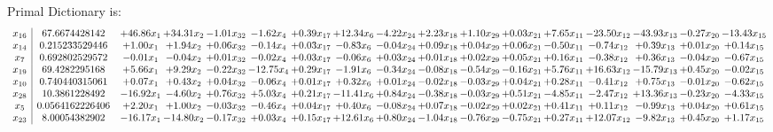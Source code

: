 \documentclass[9pt]{article}
\begin{document}
Primal Dictionary is:
\[\begin{array}{c| c c@{\hskip 2pt} c@{\hskip 2pt} c@{\hskip 2pt} c@{\hskip 2pt} c@{\hskip 2pt} c@{\hskip 2pt} c@{\hskip 2pt} c@{\hskip 2pt} c@{\hskip 2pt} c@{\hskip 2pt} c@{\hskip 2pt} c@{\hskip 2pt} c@{\hskip 2pt} c@{\hskip 2pt} c@{\hskip 2pt} }
 x_{16}   &  67.6674428142 & + 46.86 x_{1} & + 34.31 x_{2} & -1.01 x_{32} & -1.62 x_{4} & +  0.39 x_{17} & + 12.34 x_{6} & -4.22 x_{24} & +  2.23 x_{18} & +  1.10 x_{29} & +  0.03 x_{21} & +  7.65 x_{11} & -23.50 x_{12} & -43.93 x_{13} & -0.27 x_{20} & -13.43 x_{15}\\
 x_{14}   &  0.215233529446 & +  1.00 x_{1} & +  1.94 x_{2} & +  0.06 x_{32} & -0.14 x_{4} & +  0.03 x_{17} & -0.83 x_{6} & -0.04 x_{24} & +  0.09 x_{18} & +  0.04 x_{29} & +  0.06 x_{21} & -0.50 x_{11} & -0.74 x_{12} & +  0.39 x_{13} & +  0.01 x_{20} & +  0.14 x_{15}\\
 x_{7}   &  0.692802529572 & -0.01 x_{1} & -0.04 x_{2} & +  0.01 x_{32} & -0.02 x_{4} & +  0.03 x_{17} & -0.06 x_{6} & +  0.03 x_{24} & +  0.01 x_{18} & +  0.02 x_{29} & +  0.05 x_{21} & +  0.16 x_{11} & -0.38 x_{12} & +  0.36 x_{13} & -0.04 x_{20} & -0.67 x_{15}\\
 x_{19}   &  69.4282295168 & +  5.66 x_{1} & +  9.29 x_{2} & -0.22 x_{32} & -12.75 x_{4} & +  0.29 x_{17} & -1.91 x_{6} & -0.34 x_{24} & -0.08 x_{18} & -0.54 x_{29} & -0.16 x_{21} & +  5.76 x_{11} & + 16.63 x_{12} & -15.79 x_{13} & +  0.45 x_{20} & -0.02 x_{15}\\
 x_{10}   &  0.740440315061 & +  0.07 x_{1} & +  0.43 x_{2} & +  0.04 x_{32} & -0.06 x_{4} & +  0.01 x_{17} & +  0.32 x_{6} & +  0.01 x_{24} & -0.02 x_{18} & -0.03 x_{29} & +  0.04 x_{21} & +  0.28 x_{11} & -0.41 x_{12} & +  0.75 x_{13} & -0.01 x_{20} & -0.62 x_{15}\\
 x_{28}   &  10.3861228492 & -16.92 x_{1} & -4.60 x_{2} & +  0.76 x_{32} & +  5.03 x_{4} & +  0.21 x_{17} & -11.41 x_{6} & +  0.84 x_{24} & -0.38 x_{18} & -0.03 x_{29} & +  0.51 x_{21} & -4.85 x_{11} & -2.47 x_{12} & + 13.36 x_{13} & -0.23 x_{20} & -4.33 x_{15}\\
 x_{5}   &  0.0564162226406 & +  2.20 x_{1} & +  1.00 x_{2} & -0.03 x_{32} & -0.46 x_{4} & +  0.04 x_{17} & +  0.40 x_{6} & -0.08 x_{24} & +  0.07 x_{18} & -0.02 x_{29} & +  0.02 x_{21} & +  0.41 x_{11} & +  0.11 x_{12} & -0.99 x_{13} & +  0.04 x_{20} & +  0.61 x_{15}\\
 x_{23}   &  8.00054382902 & -16.17 x_{1} & -14.80 x_{2} & -0.17 x_{32} & +  0.03 x_{4} & +  0.15 x_{17} & + 12.61 x_{6} & +  0.80 x_{24} & -1.04 x_{18} & -0.76 x_{29} & -0.75 x_{21} & +  0.27 x_{11} & + 12.07 x_{12} & -9.82 x_{13} & +  0.45 x_{20} & +  1.17 x_{15}\\

\end{array}\]
\end{document}
